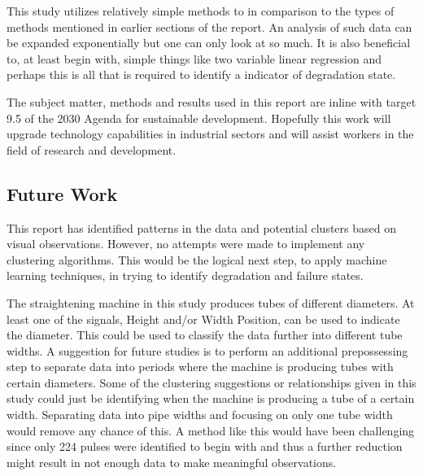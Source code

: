 \documentclass[]{article}
\begin{document}
This study utilizes relatively simple methods to in comparison to the types of methods mentioned in earlier sections of the report. An analysis of such data can be expanded exponentially but one can only look at so much. It is also beneficial to, at least begin with, simple things like two variable linear regression and perhaps this is all that is required to identify a indicator of degradation state.

The subject matter, methods and results used in this report are inline with target 9.5 of the 2030 Agenda for sustainable development\cite{united2015department}. Hopefully this work will upgrade technology capabilities in industrial sectors and will assist workers in the field of research and development. 

\subsection{Future Work}
This report has identified patterns in the data and potential clusters based on visual observations. However, no attempts were made to implement any clustering algorithms. This would be the logical next step, to apply machine learning techniques, in trying to identify degradation and failure states.

The straightening machine in this study produces tubes of different diameters. At least one of the signals, Height and/or Width Position, can be used to indicate the diameter. This could be used to classify the data further into different tube widths. A suggestion for future studies is to perform an additional prepossessing step to separate data into periods where the machine is producing tubes with certain diameters. Some of the clustering suggestions or relationships given in this study could just be identifying when the machine is producing a tube of a certain width. Separating data into pipe widths and focusing on only one tube width would remove any chance of this. A method like this would have been challenging since only 224 pulses were identified to begin with and thus a further reduction might result in not enough data to make meaningful observations.
\end{document}
